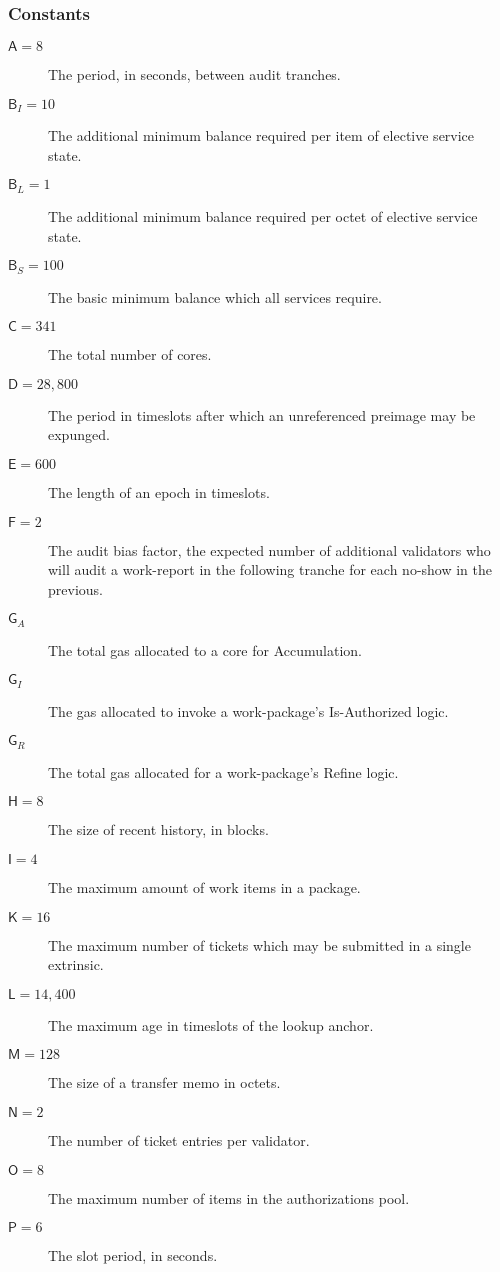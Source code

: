 \subsubsection{Constants}

\begin{description}
  \item[$\mathsf{A} = 8$] The period, in seconds, between audit tranches.
  \item[$\mathsf{B}_I = 10$] The additional minimum balance required per item of elective service state.
  \item[$\mathsf{B}_L = 1$] The additional minimum balance required per octet of elective service state.
  \item[$\mathsf{B}_S = 100$] The basic minimum balance which all services require.
  \item[$\mathsf{C} = 341$] The total number of cores.
  \item[$\mathsf{D} = 28,800$] The period in timeslots after which an unreferenced preimage may be expunged.
  \item[$\mathsf{E} = 600$] The length of an epoch in timeslots.
  \item[$\mathsf{F} = 2$] The audit bias factor, the expected number of additional validators who will audit a work-report in the following tranche for each no-show in the previous.
  \item[$\mathsf{G}_A$] The total gas allocated to a core for Accumulation.
  \item[$\mathsf{G}_I$] The gas allocated to invoke a work-package's Is-Authorized logic.
  \item[$\mathsf{G}_R$] The total gas allocated for a work-package's Refine logic.
  \item[$\mathsf{H} = 8$] The size of recent history, in blocks.
  \item[$\mathsf{I} = 4$] The maximum amount of work items in a package.
  \item[$\mathsf{K} = 16$] The maximum number of tickets which may be submitted in a single extrinsic.
  \item[$\mathsf{L} = 14,400$] The maximum age in timeslots of the lookup anchor.
  \item[$\mathsf{M} = 128$] The size of a transfer memo in octets.
  \item[$\mathsf{N} = 2$] The number of ticket entries per validator.
  \item[$\mathsf{O} = 8$] The maximum number of items in the authorizations pool.
  \item[$\mathsf{P} = 6$] The slot period, in seconds.

\end{description}
